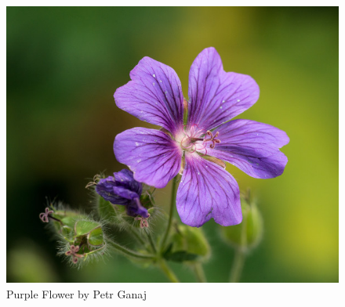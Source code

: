 \Blindtext[2]

\begin{figure}[ht]
    \centering
    \includegraphics[width=\textwidth]{img/ganajp-purple-flower.jpg}
    \caption{Purple Flower by Petr Ganaj}
    \label{fig:purple_flower}
\end{figure}

\blindtext
